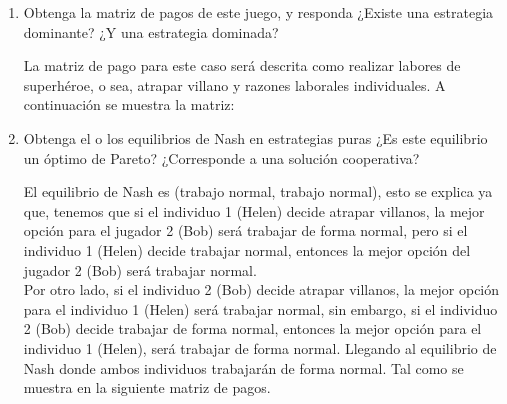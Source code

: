 \documentclass{exam}
\begin{document}
  \begin{enumerate}[label=(\alph*), ref=\alph*]
    \item Obtenga la matriz de pagos de este juego, y responda ¿Existe una estrategia dominante? ¿Y una estrategia dominada?
    \begin{solution}
    La matriz de pago para este caso será descrita como realizar labores de superhéroe, o sea, atrapar villano y razones laborales individuales. A continuación se muestra la matriz:
    
      
  \begin{center}

    
\end{center}
    \end{solution}
    
    \item Obtenga el o los equilibrios de Nash en estrategias puras ¿Es este equilibrio un  óptimo de Pareto? ¿Corresponde a una solución cooperativa?
    \begin{solution}
     El equilibrio de Nash es (trabajo normal, trabajo normal), esto se explica ya que, tenemos que si el individuo 1 (Helen) decide atrapar villanos, la mejor opción para el jugador 2 (Bob) será trabajar de forma normal, pero si el individuo 1 (Helen) decide trabajar normal, entonces la mejor opción del jugador 2 (Bob) será trabajar normal.\\
    
    Por otro lado, si el individuo 2 (Bob) decide atrapar villanos, la mejor opción para el individuo 1 (Helen) será trabajar normal, sin embargo, si el individuo 2 (Bob) decide trabajar de forma normal, entonces la mejor opción para el individuo 1 (Helen), será trabajar de forma normal. Llegando al equilibrio de Nash donde ambos individuos trabajarán de forma normal. 
    Tal como se muestra en la siguiente matriz de pagos.
  

\end{solution}
\end{enumerate}
\end{document}
